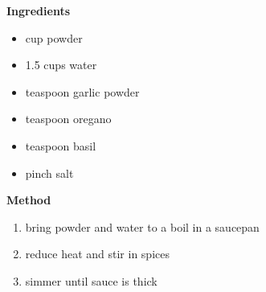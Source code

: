 \documentclass[web-recipes.tex]{subfiles}
\begin{document}
\begin{mdframed}[nobreak]
\begin{minipage}[t]{0.65\textwidth}
    \begin{minipage}[t]{0.3\textwidth}
      {\bfseries Ingredients}
      \begin{itemize}
      \item {} cup powder
      \item 1.5 cups water
      \item {} teaspoon garlic powder
      \item {} teaspoon oregano
      \item {} teaspoon basil
      \item pinch salt
    \end{itemize}
  \end{minipage}\quad
  \begin{minipage}[t]{0.5\textwidth}
      {\bfseries Method}
    \begin{enumerate}
      \item bring powder and water to a boil in a saucepan
      \item reduce heat and stir in spices
      \item simmer until sauce is thick
    \end{enumerate}
\end{minipage}
\end{minipage}

\vspace{3ex}
\centering{\ttfamily\small \myurl}
\end{mdframed}
\end{document}
